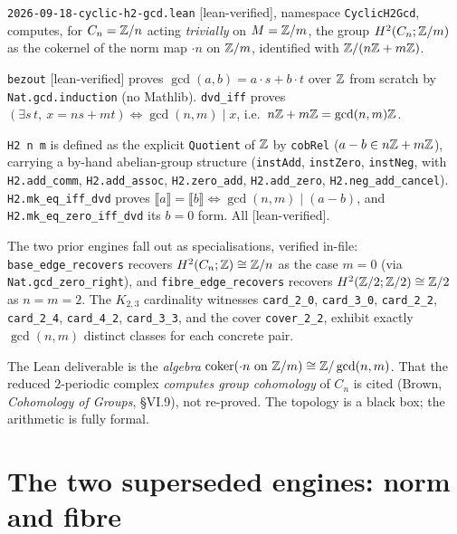 \texttt{2026-09-18-cyclic-h2-gcd.lean} [lean-verified], namespace \texttt{CyclicH2Gcd}, computes, for $C_n=\mathbb{Z}/n$ acting \emph{trivially} on $M=\mathbb{Z}/m$, the group $H^2(C_n;\mathbb{Z}/m)$ as the cokernel of the norm map $\cdot n$ on $\mathbb{Z}/m$, identified with $\mathbb{Z}/(n\mathbb{Z}+m\mathbb{Z})$.

\begin{theorem}
\label{thm:bezout}
\texttt{bezout} [lean-verified] proves $\gcd(a,b)=a\cdot s+b\cdot t$ over $\mathbb{Z}$ from scratch by \texttt{Nat.gcd.induction} (no Mathlib). \texttt{dvd\_iff} proves $(\exists s\,t,\ x=n s+m t)\iff\gcd(n,m)\mid x$, i.e.\ $n\mathbb{Z}+m\mathbb{Z}=\gcd(n,m)\mathbb{Z}$.
\end{theorem}

\begin{theorem}
\label{thm:gcd-H2}
\texttt{H2 n m} is defined as the explicit \texttt{Quotient} of $\mathbb{Z}$ by \texttt{cobRel} ($a-b\in n\mathbb{Z}+m\mathbb{Z}$), carrying a by-hand abelian-group structure (\texttt{instAdd}, \texttt{instZero}, \texttt{instNeg}, with \texttt{H2.add\_comm}, \texttt{H2.add\_assoc}, \texttt{H2.zero\_add}, \texttt{H2.add\_zero}, \texttt{H2.neg\_add\_cancel}). \texttt{H2.mk\_eq\_iff\_dvd} proves $\llbracket a\rrbracket=\llbracket b\rrbracket\iff\gcd(n,m)\mid(a-b)$, and \texttt{H2.mk\_eq\_zero\_iff\_dvd} its $b=0$ form. All [lean-verified].
\end{theorem}

The two prior engines fall out as specialisations, verified in-file: \texttt{base\_edge\_recovers} recovers $H^2(C_n;\mathbb{Z})\cong\mathbb{Z}/n$ as the case $m=0$ (via \texttt{Nat.gcd\_zero\_right}), and \texttt{fibre\_edge\_recovers} recovers $H^2(\mathbb{Z}/2;\mathbb{Z}/2)\cong\mathbb{Z}/2$ as $n=m=2$. The $K_{2,3}$ cardinality witnesses \texttt{card\_2\_0}, \texttt{card\_3\_0}, \texttt{card\_2\_2}, \texttt{card\_2\_4}, \texttt{card\_4\_2}, \texttt{card\_3\_3}, and the cover \texttt{cover\_2\_2}, exhibit exactly $\gcd(n,m)$ distinct classes for each concrete pair.

\begin{remark}
\label{rem:gcd-blackbox}
The Lean deliverable is the \emph{algebra} $\mathrm{coker}(\cdot n\text{ on }\mathbb{Z}/m)\cong\mathbb{Z}/\gcd(n,m)$. That the reduced $2$-periodic complex \emph{computes group cohomology} of $C_n$ is cited (Brown, \emph{Cohomology of Groups}, \S VI.9), not re-proved. The topology is a black box; the arithmetic is fully formal.
\end{remark}

\section{The two superseded engines: norm and fibre}
\label{sec:norm-fibre}

